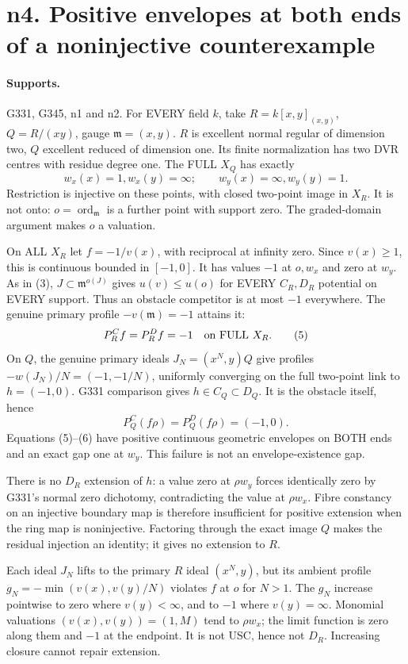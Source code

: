 \section{n4. Positive envelopes at both ends of a noninjective counterexample}
\paragraph{Supports.} G331, G345, n1 and n2.
For EVERY field $k$, take $R=k[x,y]_{(x,y)}$, $Q=R/(xy)$, gauge $\mathfrak m=(x,y)$. $R$ is excellent normal regular of dimension two, $Q$ excellent reduced of dimension one. Its finite normalization has two DVR centres with residue degree one. The FULL $X_Q$ has exactly
\[
 w_x(x)=1,w_x(y)=\infty;\qquad w_y(x)=\infty,w_y(y)=1.
\]
Restriction is injective on these points, with closed two-point image in $X_R$. It is not onto: $o=\operatorname{ord}_{\mathfrak m}$ is a further point with support zero. The graded-domain argument makes $o$ a valuation.

On ALL $X_R$ let $f=-1/v(x)$, with reciprocal at infinity zero. Since $v(x)\ge1$, this is continuous bounded in $[-1,0]$. It has values $-1$ at $o,w_x$ and zero at $w_y$. As in (3), $J\subset\mathfrak m^{o(J)}$ gives $u(v)\le u(o)$ for EVERY $C_R,D_R$ potential on EVERY support. Thus an obstacle competitor is at most $-1$ everywhere. The genuine primary profile $-v(\mathfrak m)=-1$ attains it:
\[
 P_R^Cf=P_R^Df=-1\quad\hbox{on FULL }X_R. \tag{5}
\]
On $Q$, the genuine primary ideals $J_N=(x^N,y)Q$ give profiles $-w(J_N)/N=(-1,-1/N)$, uniformly converging on the full two-point link to $h=(-1,0)$. G331 comparison gives $h\in C_Q\subset D_Q$. It is the obstacle itself, hence
\[
 P_Q^C(f\rho)=P_Q^D(f\rho)=(-1,0). \tag{6}
\]
Equations (5)--(6) have positive continuous geometric envelopes on BOTH ends and an exact gap one at $w_y$. This failure is not an envelope-existence gap.

There is no $D_R$ extension of $h$: a value zero at $\rho w_y$ forces identically zero by G331's normal zero dichotomy, contradicting the value at $\rho w_x$. Fibre constancy on an injective boundary map is therefore insufficient for positive extension when the ring map is noninjective. Factoring through the exact image $Q$ makes the residual injection an identity; it gives no extension to $R$.

Each ideal $J_N$ lifts to the primary $R$ ideal $(x^N,y)$, but its ambient profile $g_N=-\min(v(x),v(y)/N)$ violates $f$ at $o$ for $N>1$. The $g_N$ increase pointwise to zero where $v(y)<\infty$, and to $-1$ where $v(y)=\infty$. Monomial valuations $(v(x),v(y))=(1,M)$ tend to $\rho w_x$; the limit function is zero along them and $-1$ at the endpoint. It is not USC, hence not $D_R$. Increasing closure cannot repair extension.

